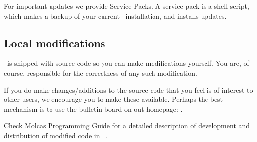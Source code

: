 For important updates we provide Service Packs. A service pack is a shell 
script, which makes a backup of your current \molcas\ installation, and installs
updates.


\subsection{Local modifications}

\molcas\ is shipped with source code so you can make modifications
yourself. You are, of course, responsible for the correctness of any
such modification. 

If you do make changes/additions to the source code that you feel is of
interest to other users, we encourage you to make these available.
Perhaps the best mechanism is to use the bulletin board on out homepage:
\MolcasWWW. 

Check Molcas Programming Guide for a detailed description of development
and distribution of modified code in \molcas\ .

